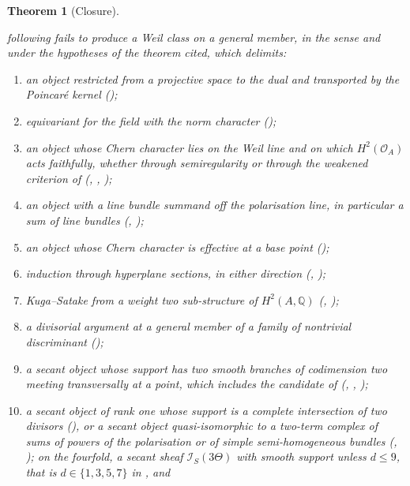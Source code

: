 \documentclass[11pt,reqno]{amsart}
\theoremstyle{plain}
\newtheorem{theorem}{Theorem}[section]
\theoremstyle{definition}
\theoremstyle{remark}
\newcommand{\QQ}{\mathbb{Q}}
\newcommand{\cO}{\mathcal{O}}
\newcommand{\cI}{\mathcal{I}}
\begin{document}
\begin{theorem}[Closure]
\begin{enumerate}[label=\textup{(\roman*)},leftmargin=2.8em,itemsep=4pt]
  following fails to produce a Weil class on a general member, in the sense
  and under the hypotheses of the theorem cited, which 
  delimits:
  \begin{enumerate}[label=\textup{(\alph*)},nosep,leftmargin=2.2em]
  \item an object restricted from a projective space to the dual and
    transported by the Poincar\'e kernel (\cite[Theorem~7.3]{paperI});
  \item equivariant for the field with the norm character
    (\cite[Theorem~5.6]{paperI});
  \item an object whose Chern character lies on the Weil line and on which
    $H^{2}(\cO_{A})$ acts faithfully, whether through semiregularity or
    through the weakened criterion of \cite[Question~11.4]{Mar25b}
    (\cite[Theorem~9.7]{paperI}, \cite[Corollary~9.18]{paperI}, \cite[Theorem~9.19]{paperI});
  \item an object with a line bundle summand off the polarisation line, in
    particular a sum of line bundles (\cite[Theorem~9.20]{paperI},
    \cite[Corollary~4.21]{paperII});
  \item an object whose Chern character is effective at a base point
    (\cite[Theorem~4.5]{paperII});
  \item induction through hyperplane sections, in either direction
    (\cite[Theorem~10.3]{paperI}, \cite[Theorem~10.8]{paperI});
  \item Kuga--Satake from a weight two sub-structure of $H^{2}(A,\QQ)$
    (\cite[Proposition~11.11]{paperI}, \cite[Corollary~11.12]{paperI});
  \item a divisorial argument at a general member of a family of nontrivial
    discriminant (\cite[Proposition~15.18]{paperI});
  \item a secant object whose support has two smooth branches of codimension
    two meeting transversally at a point, which includes the candidate of
    \cite[Section~12]{Mar25b} (\cite[Theorem~4.61]{paperII},
    \cite[Corollary~4.63]{paperII}, \cite[Corollary~4.77]{paperII});
  \item a secant object of rank one whose support is a complete intersection
    of two divisors (\cite[Theorem~4.81]{paperII}), or a secant object quasi-isomorphic to
    a two-term complex of sums of powers of the polarisation or of simple
    semi-homogeneous bundles (\cite[Theorem~4.89]{paperII}, \cite[Theorem~4.92]{paperII}); on
    the fourfold, a secant sheaf $\cI_{S}(3\Theta)$ with smooth support
    unless $d\le9$, that is $d\in\{1,3,5,7\}$ in \cite[Setup~4.51]{paperII}, and

\end{enumerate}
\end{enumerate}
\end{theorem}
\end{document}
